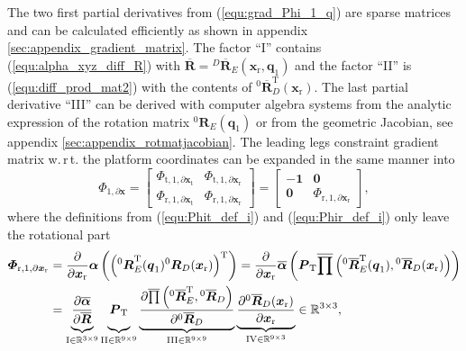 \documentclass[robotics,article,accept,moreauthors,pdftex]{Definitions/mdpi}
\newcommand{\bm}[1]{\boldsymbol{#1}}
\newcommand{\rotmat}[2]{{{ }^{#1}\boldsymbol{R}}_{#2}}
\newcommand{\rotmato}[2]{{{ }^{#1}\boldsymbol{\overline{R}}}_{#2}}
\newcommand{\transp}[0]{{\mathrm{T}}}
\let\Phi\varPhi
\begin{document}
The two first partial derivatives from (\ref{equ:grad_Phi_1_q}) are sparse matrices and can be calculated efficiently as shown in appendix \ref{sec:appendix_gradient_matrix}.
The factor ``I'' contains (\ref{equ:alpha_xyz_diff_R}) with $\overline{\bm{R}}=\rotmato{D}{E}(\bm{x}_{\mathrm{r}},\bm{q}_1)$ and the factor ``II'' is (\ref{equ:diff_prod_mat2}) with the contents of $\rotmato{0}{D}^\transp(\bm{x}_{\mathrm{r}})$.
The last partial derivative ``III'' can be derived with computer algebra systems from the analytic expression of the rotation matrix $\rotmat{0}{E}(\bm{q}_1)$ or from the geometric Jacobian, see appendix \ref{sec:appendix_rotmatjacobian}.
The leading legs constraint gradient matrix w.\,r\,t. the platform coordinates can be expanded in the same manner into
%
\begin{equation}
\bm{\Phi}_{1,\partial\bm{x}}
=
\begin{bmatrix}
\bm{\Phi}_{\mathrm{t},1,\partial\bm{x}_\mathrm{t}} & \bm{\Phi}_{\mathrm{t},1,\partial\bm{x}_\mathrm{r}} \\
\bm{\Phi}_{\mathrm{r},1,\partial\bm{x}_\mathrm{t}} &
\bm{\Phi}_{\mathrm{r},1,\partial\bm{x}_\mathrm{r}}
\end{bmatrix}
=
\begin{bmatrix}
-\bm{1} & \bm{0} \\
\bm{0} &
\bm{\Phi}_{\mathrm{r},1,\partial\bm{x}_\mathrm{r}}
\end{bmatrix},
\label{equ:Phi_1_grad_x}
\end{equation}
%
where the definitions from (\ref{equ:Phit_def_i}) and (\ref{equ:Phir_def_i}) only leave the rotational part
%
\begin{align}
\bm{\Phi}_{\mathrm{r},1,\partial\bm{x}_\mathrm{r}}
&=
\frac{\partial}{\partial \bm{x}_{\mathrm{r}}} \bm{\alpha}\left(\left(\rotmat{0}{E}^\transp(\bm{q}_1) \rotmat{0}{D}(\bm{x}_{\mathrm{r}})\right)^\transp\right) \label{equ:grad_Phi_1_x} 
=
\frac{\partial}{\partial \bm{x}_{\mathrm{r}}} \overline{\bm{\alpha}}\left(
\bm{P}_{\mathrm{T}}
\overline{\prod}\left( \rotmato{0}{E}^\transp(\bm{q}_1), \rotmato{0}{D}(\bm{x}_{\mathrm{r}})\right)\right) \\
&=
\underbrace{
	\vphantom{\frac{\partial \overline{\prod}\left( \rotmato{0}{E}^\transp, \rotmato{0}{D}\right)}{\partial \rotmato{0}{D}}}
    \frac{\partial \overline{\bm{\alpha}}}{\partial \overline{\bm{R}}}
	}_{\mathrm{I} \in {\mathbb{R}}^{3 \times 9}}
\underbrace{
	\vphantom{\frac{\partial \overline{\prod}\left( \rotmato{0}{E}^\transp, \rotmato{0}{D}\right)}{\partial \rotmato{0}{D}}}
    \bm{P}_{\mathrm{T}}
	}_{\mathrm{II} \in {\mathbb{R}}^{9 \times 9}}
\underbrace{
	\frac{\partial \overline{\prod}\left( \rotmato{0}{E}^\transp, \rotmato{0}{D}\right)}{\partial \rotmato{0}{D}}
	}_{\mathrm{III} \in {\mathbb{R}}^{9 \times 9}}
\underbrace{
	\frac{\partial \rotmato{0}{D}(\bm{x}_{\mathrm{r}})}{\partial \bm{x}_{\mathrm{r}}}
	}_{\mathrm{IV} \in {\mathbb{R}}^{9 \times 3}}
\in {\mathbb{R}}^{3 \times 3}, \nonumber
\end{align}
\end{document}
